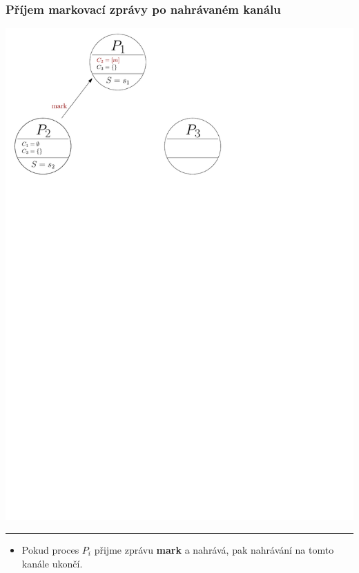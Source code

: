 \documentclass[usenames,dvipsnames,9pt]{beamer}
\begin{document}
\begin{frame}
\frametitle{Příjem markovací zprávy po nahrávaném kanálu}
	\vspace{1.8em}
	\begin{center}
		{\includegraphics[width=\snapsize\linewidth]{13/figs/snapshot5.pdf}}%
	\end{center}

	{
		\vspace{2em}\hrule\vspace{1em}
		\begin{itemize}
			\item Pokud proces $P_i$ přijme zprávu {\bf mark} a nahrává, pak nahrávání na tomto kanále ukončí.
		\end{itemize}
	}
\vspace{4em}
\end{frame}
\end{document}
